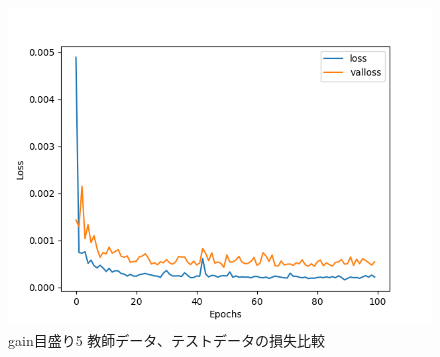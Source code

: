 \documentclass{jreport}		%
\begin{document}
\begin{figure}[htbp]
 \begin{center}
  \includegraphics[width=150mm]{gain5_loss_hikaku.png}
 \end{center}
 \caption{gain目盛り5 教師データ、テストデータの損失比較}
 \label{fig:one}
\end{figure}
\end{document}

